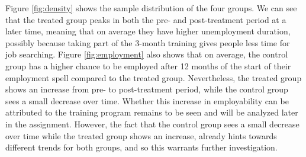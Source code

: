 \documentclass{scrartcl}
\begin{document}
Figure \ref{fig:density} shows the sample distribution of the four groups. We can see that the treated group peaks in both the pre- and post-treatment period at a later time, meaning that on average they have higher unemployment duration, possibly because taking part of the 3-month training gives people less time for job searching. Figure \ref{fig:employment} also shows that on average, the control group has a higher chance to be employed after 12 months of the start of their employment spell compared to the treated group. Nevertheless, the treated group shows an increase from pre- to post-treatment period, while the control group sees a small decrease over time. Whether this increase in employability can be attributed to the training program remains to be seen and will be analyzed later in the assignment. However, the fact that the control group sees a small decrease over time while the treated group shows an increase, already hints towards different trends for both groups, and so this warrants further investigation. \\ 
\end{document}
